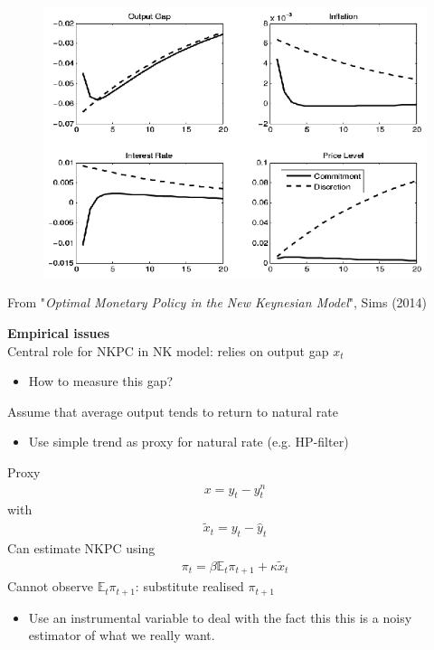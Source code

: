 \documentclass{beamer}
\begin{document}
\begin{frame}
  \begin{figure}
    \includegraphics{sims.eps}
  \end{figure}
  From "\textit{Optimal Monetary Policy in the New Keynesian Model}", Sims (2014)
\end{frame}

\begin{frame}
  \textbf{Empirical issues}\\ \medskip
  Central role for NKPC in NK model: relies on output gap $x_t$
  \begin{itemize}
    \item How to measure this gap?
  \end{itemize}
  \medskip
  Assume that average output tends to return to natural rate
 \begin{itemize}
   \item Use simple trend as proxy for natural rate (e.g. HP-filter)
 \end{itemize}
\end{frame}

\begin{frame}
 Proxy
 \begin{align}
  x=y_t-y_t^n
 \end{align}
 with
\begin{align}
  \tilde{x}_t=y_t-\hat{y}_t
\end{align}
\medskip
Can estimate NKPC using 
\begin{align}
  \pi_t = \beta \mathbb{E}_t \pi_{t+1} + \kappa\tilde{x}_t
\end{align}
\medskip
Cannot observe $\mathbb{E}_t \pi_{t+1}$: substitute realised $\pi_{t+1}$ 
\begin{itemize}
  \item Use an instrumental variable to deal with the fact this this is a noisy estimator of what we really want.
\end{itemize}
\end{frame}
\end{document}
